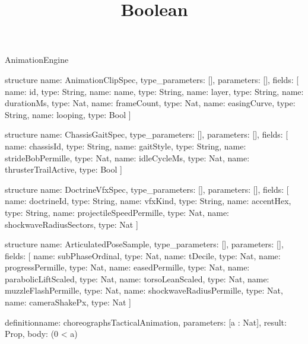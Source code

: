 \begin{lexlean}{AnimationEngine}
\title{Boolean}
\begin{semanticmodule}
structure{
  name: AnimationClipSpec,
  type_parameters: [],
  parameters: [],
  fields: [
    {name: id, type: String},
    {name: name, type: String},
    {name: layer, type: String},
    {name: durationMs, type: Nat},
    {name: frameCount, type: Nat},
    {name: easingCurve, type: String},
    {name: looping, type: Bool}
  ]
}

structure{
  name: ChassisGaitSpec,
  type_parameters: [],
  parameters: [],
  fields: [
    {name: chassisId, type: String},
    {name: gaitStyle, type: String},
    {name: strideBobPermille, type: Nat},
    {name: idleCycleMs, type: Nat},
    {name: thrusterTrailActive, type: Bool}
  ]
}

structure{
  name: DoctrineVfxSpec,
  type_parameters: [],
  parameters: [],
  fields: [
    {name: doctrineId, type: String},
    {name: vfxKind, type: String},
    {name: accentHex, type: String},
    {name: projectileSpeedPermille, type: Nat},
    {name: shockwaveRadiusSectors, type: Nat}
  ]
}

structure{
  name: ArticulatedPoseSample,
  type_parameters: [],
  parameters: [],
  fields: [
    {name: subPhaseOrdinal, type: Nat},
    {name: tDecile, type: Nat},
    {name: progressPermille, type: Nat},
    {name: easedPermille, type: Nat},
    {name: parabolicLiftScaled, type: Nat},
    {name: torsoLeanScaled, type: Nat},
    {name: muzzleFlashPermille, type: Nat},
    {name: shockwaveRadiusPermille, type: Nat},
    {name: cameraShakePx, type: Nat}
  ]
}

definition{name: choreographsTacticalAnimation, parameters: [a : Nat], result: Prop, body: (0 < a)}


\end{semanticmodule}
\end{lexlean}
